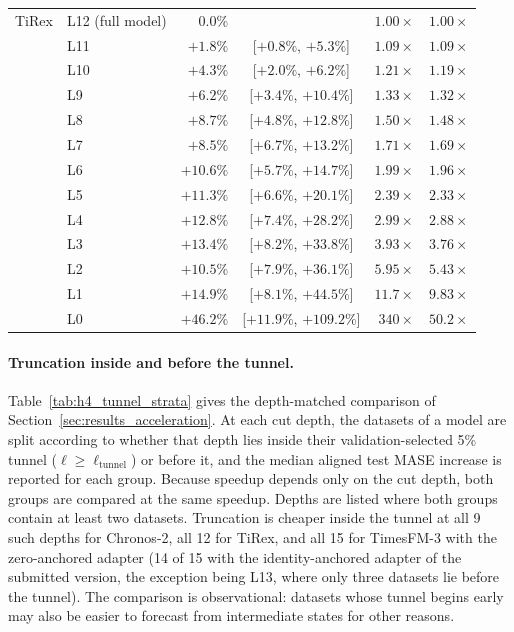 \documentclass{article} %
\begin{document}
\begin{table}[p]
\begin{tabular}{@{}llrcrr@{}}
\midrule
TiRex & L12 (full model) & $0.0\%$ &  & $1.00\times$ & $1.00\times$ \\
 & L11 & $+1.8\%$ & [$+0.8\%$, $+5.3\%$] & $1.09\times$ & $1.09\times$ \\
 & L10 & $+4.3\%$ & [$+2.0\%$, $+6.2\%$] & $1.21\times$ & $1.19\times$ \\
 & L9 & $+6.2\%$ & [$+3.4\%$, $+10.4\%$] & $1.33\times$ & $1.32\times$ \\
 & L8 & $+8.7\%$ & [$+4.8\%$, $+12.8\%$] & $1.50\times$ & $1.48\times$ \\
 & L7 & $+8.5\%$ & [$+6.7\%$, $+13.2\%$] & $1.71\times$ & $1.69\times$ \\
 & L6 & $+10.6\%$ & [$+5.7\%$, $+14.7\%$] & $1.99\times$ & $1.96\times$ \\
 & L5 & $+11.3\%$ & [$+6.6\%$, $+20.1\%$] & $2.39\times$ & $2.33\times$ \\
 & L4 & $+12.8\%$ & [$+7.4\%$, $+28.2\%$] & $2.99\times$ & $2.88\times$ \\
 & L3 & $+13.4\%$ & [$+8.2\%$, $+33.8\%$] & $3.93\times$ & $3.76\times$ \\
 & L2 & $+10.5\%$ & [$+7.9\%$, $+36.1\%$] & $5.95\times$ & $5.43\times$ \\
 & L1 & $+14.9\%$ & [$+8.1\%$, $+44.5\%$] & $11.7\times$ & $9.83\times$ \\
 & L0 & $+46.2\%$ & [$+11.9\%$, $+109.2\%$] & $340\times$ & $50.2\times$ \\
\bottomrule
\end{tabular}
\end{table}

\paragraph{Truncation inside and before the tunnel.} Table~\ref{tab:h4_tunnel_strata} gives the
depth-matched comparison of Section~\ref{sec:results_acceleration}. At each cut depth, the datasets
of a model are split according to whether that depth lies inside their validation-selected 5\%
tunnel ($\ell\geq\ell_{\mathrm{tunnel}}$) or before it, and the median aligned test MASE increase
is reported for each group. Because speedup depends only on the cut depth, both groups are compared
at the same speedup. Depths are listed where both groups contain at least two datasets. Truncation
is cheaper inside the tunnel at all 9 such depths for Chronos-2, all 12 for TiRex, and all 15 for
TimesFM-3 with the zero-anchored adapter (14 of 15 with the identity-anchored adapter of the
submitted version, the exception being L13, where only three datasets lie before the tunnel).
The comparison is observational: datasets whose tunnel begins early may also be easier to forecast
from intermediate states for other reasons.
\end{document}
